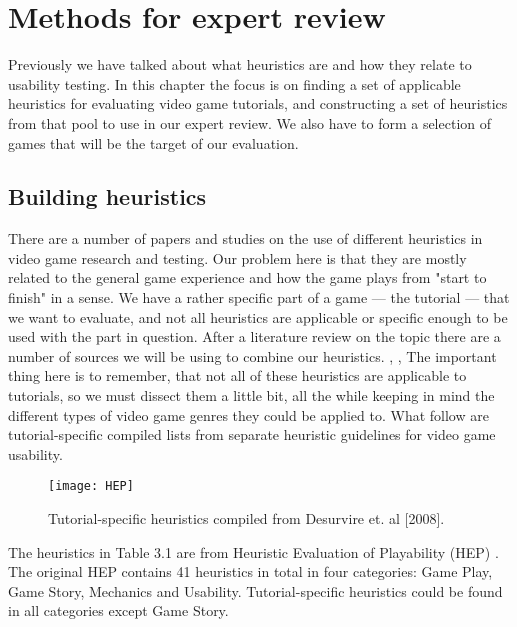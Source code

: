 \chapter{Methods for expert review}

Previously we have talked about what heuristics are and how they relate to usability testing. In this chapter the focus is on finding a set of applicable heuristics for evaluating video game tutorials, and constructing a set of heuristics from that pool to use in our expert review. We also have to form a selection of games that will be the target of our evaluation.

\section{Building heuristics}

There are a number of papers and studies on the use of different heuristics in video game research and testing. Our problem here is that they are mostly related to the general game experience and how the game plays from "start to finish" in a sense. We have a rather specific part of a game --- the tutorial --- that we want to evaluate, and not all heuristics are applicable or specific enough to be used with the part in question. After a literature review on the topic there are a number of sources we will be using to combine our heuristics. \cite{Desurvire2004}, \cite{Federoff2002}, \cite{Pinelle2008}
The important thing here is to remember, that not all of these heuristics are applicable to tutorials, so we must dissect them a little bit, all the while keeping in mind the different types of video game genres they could be applied to. What follow are tutorial-specific compiled lists from separate heuristic guidelines for video game usability.

\begin{figure}
	\centering
	\texttt{[image: HEP]}
	\caption{Tutorial-specific heuristics compiled from Desurvire et. al [2008].}
\end{figure}
\clearpage

The heuristics in Table 3.1 are from Heuristic Evaluation of Playability (HEP) \cite{Desurvire2004}. The original HEP contains 41 heuristics in total in four categories: Game Play, Game Story, Mechanics and Usability. Tutorial-specific heuristics could be found in all categories except Game Story. 

